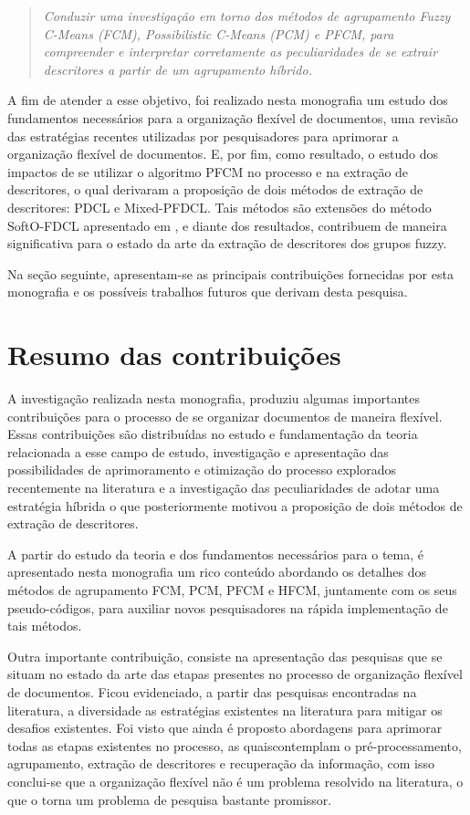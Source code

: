 \begin{quote}
\textit{Conduzir uma investigação em torno dos métodos de agrupamento Fuzzy C-Means (FCM), Possibilistic C-Means (PCM) e PFCM, para compreender e interpretar corretamente as peculiaridades de se extrair descritores a partir de um
agrupamento híbrido.}
\end{quote}

A fim de atender a esse objetivo, foi realizado nesta monografia um estudo dos fundamentos
necessários para a organização flexível de documentos, uma revisão das estratégias recentes
utilizadas por pesquisadores para aprimorar a organização flexível de documentos. E, por fim, como
resultado, o estudo dos impactos de se utilizar o algoritmo PFCM no processo e na extração de
descritores, o qual derivaram a proposição de dois métodos de extração de descritores: PDCL e
Mixed-PFDCL. Tais métodos são extensões do método SoftO-FDCL apresentado em \cite{Nogueira2013}, e
diante dos resultados, contribuem de maneira significativa para o estado da arte da extração de
descritores dos grupos fuzzy.

Na seção seguinte, apresentam-se as principais contribuições fornecidas por esta monografia e os
possíveis trabalhos futuros que derivam desta pesquisa.

\section{Resumo das contribuições}

A investigação realizada nesta monografia, produziu algumas importantes contribuições para o
processo de se organizar documentos de maneira flexível. Essas contribuições são distribuídas no estudo e
fundamentação da teoria relacionada a esse campo de estudo, investigação e apresentação das
possibilidades de aprimoramento e otimização do processo explorados recentemente na literatura e a
investigação das peculiaridades de adotar uma estratégia híbrida o que posteriormente motivou a
proposição de dois métodos de extração de descritores. 

A partir do estudo da teoria e dos fundamentos necessários para o tema, é apresentado nesta
monografia um rico conteúdo abordando os detalhes dos métodos de agrupamento FCM, PCM, PFCM e HFCM,
juntamente com os seus pseudo-códigos, para auxiliar novos pesquisadores na rápida implementação de
tais métodos.

Outra importante contribuição, consiste na apresentação das pesquisas que se situam no estado da
arte das etapas presentes no processo de organização flexível de documentos. Ficou evidenciado, a
partir das pesquisas encontradas na literatura, a diversidade as estratégias existentes na literatura
para mitigar os desafios existentes. Foi visto que ainda é proposto abordagens para aprimorar todas
as etapas existentes no processo, as quaiscontemplam o pré-processamento, agrupamento, extração
de descritores e recuperação da informação, com isso conclui-se que a organização flexível não é um
problema resolvido na literatura, o que o torna um problema de pesquisa bastante promissor. 

